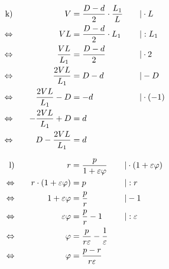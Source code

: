 \begin{exercise}
\begin{minipage}[t]{0.47\linewidth}
\begin{alignat*}{3}
        \text{k)}&\quad
        &
        V&=\frac{D-d}{2}\cdot\frac{L_{1}}{L}
        &
        \quad&|\cdot L
        \\
        \Leftrightarrow&\quad
        &
        VL&=\frac{D-d}{2}\cdot L_{1}
        &
        \quad&|:L_{1}
        \\
        \Leftrightarrow&\quad
        &
        \frac{VL}{L_{1}}&=\frac{D-d}{2}
        &
        \quad&|\cdot2
        \\
        \Leftrightarrow&\quad
        &
        \frac{2VL}{L_{1}}&=D-d
        &
        \quad&|-D
        \\
        \Leftrightarrow&\quad
        &
        \frac{2VL}{L_{1}}-D&=-d
        &
        \quad&|\cdot(-1)
        \\
        \Leftrightarrow&\quad
        &
        -\frac{2VL}{L_{1}}+D&=d
        &
        \quad&\relax
        \\
        \Leftrightarrow&\quad
        &
        D-\frac{2VL}{L_{1}}&=d
        &
        \quad&\relax
      \end{alignat*}
    \end{minipage}\hfill
    \begin{minipage}[t]{0.51\linewidth}
      \makeatletter\@fleqntrue\makeatother
      \begin{alignat*}{3}
        \text{l)}&\quad
        &
        r&=\frac{p}{1+\varepsilon\varphi}
        &
        \quad&|\cdot(1+\varepsilon\varphi)
        \\
        \Leftrightarrow&\quad
        &
        r\cdot(1+\varepsilon\varphi)&=p
        &
        \quad&|:r
        \\
        \Leftrightarrow&\quad
        &
        1+\varepsilon\varphi&=\frac{p}{r}
        &
        \quad&|-1
        \\
        \Leftrightarrow&\quad
        &
        \varepsilon\varphi&=\frac{p}{r}-1
        &
        \quad&|:\varepsilon
        \\
        \Leftrightarrow&\quad
        &
        \varphi&=\frac{p}{r\varepsilon}-\frac{1}{\varepsilon}
        &
        \quad&\relax
        \\
        \Leftrightarrow&\quad
        &
        \varphi&=\frac{p-r}{r\varepsilon}
        &
        \quad&\relax
      \end{alignat*}
    \end{minipage}\par

\end{exercise}
